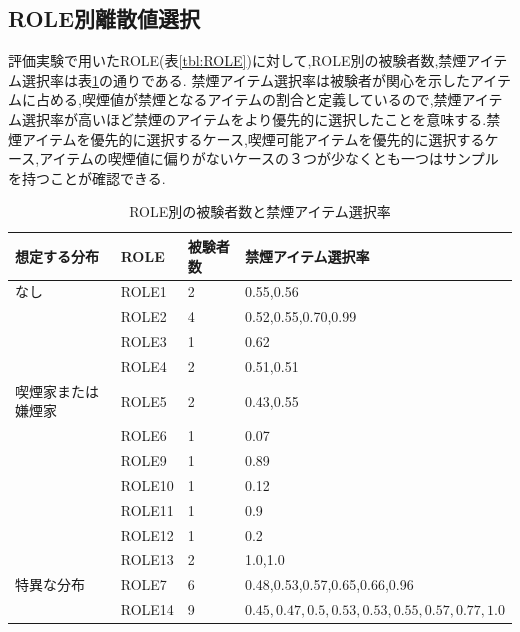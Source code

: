 \subsection{ROLE別離散値選択}
評価実験で用いたROLE(表\ref{tbl:ROLE})に対して,ROLE別の被験者数,禁煙アイテム選択率は表\ref{tbl:RoleUserSmoke}の通りである.
禁煙アイテム選択率は被験者が関心を示したアイテムに占める,喫煙値が禁煙となるアイテムの割合と定義しているので,禁煙アイテム選択率が高いほど禁煙のアイテムをより優先的に選択したことを意味する.禁煙アイテムを優先的に選択するケース,喫煙可能アイテムを優先的に選択するケース,アイテムの喫煙値に偏りがないケースの３つが少なくとも一つはサンプルを持つことが確認できる.
\begin{table}[t]
    \caption{ROLE別の被験者数と禁煙アイテム選択率} \label{tbl:RoleUserSmoke}
    \begin{tabular}{p{}p{5em}p{}l} 
\hline
想定する分布&ROLE&被験者数& 禁煙アイテム選択率 \\ \hline
なし&ROLE1&2& 0.55,0.56\\ 
&ROLE2&4& 0.52,0.55,0.70,0.99 \\ 
&ROLE3&1& 0.62 \\ 
&ROLE4&2& 0.51,0.51 \\ \hline
喫煙家または嫌煙家&ROLE5&2& 0.43,0.55 \\ 
&ROLE6&1& 0.07 \\
&ROLE9&1&0.89 \\ 
&ROLE10&1& 0.12 \\ 
&ROLE11&1& 0.9 \\ 
&ROLE12&1& 0.2 \\ 
&ROLE13&2& 1.0,1.0 \\  \hline
特異な分布&ROLE7&6& 0.48,0.53,0.57,0.65,0.66,0.96 \\ 
&ROLE14&9& $0.45,0.47,0.5,0.53,0.53,0.55,0.57,0.77,1.0$ \\ \hline
    \end{tabular}
\end{table}

